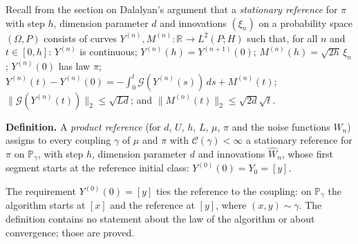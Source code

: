 \documentclass[11pt,a4paper]{article}
\begin{document}
Recall from the section on Dalalyan's argument that a \emph{stationary reference} for \(\pi\) with step \(h\), dimension parameter \(d\) and innovations \((\xi_n)\) on a probability space \((\Omega,P)\) consists of curves \(Y^{(n)},M^{(n)}:\mathbb R\to L^2(P;H)\) such that, for all \(n\) and \(t\in[0,h]\): \(Y^{(n)}\) is continuous; \(Y^{(n)}(h)=Y^{(n+1)}(0)\); \(M^{(n)}(h)=\sqrt{2h}\,\xi_n\); \(Y^{(n)}(0)\) has law \(\pi\); \(Y^{(n)}(t)-Y^{(n)}(0)=-\int_0^t\mathcal G(Y^{(n)}(s))\,ds+M^{(n)}(t)\); \(\|\mathcal G(Y^{(n)}(t))\|_2\le\sqrt{Ld}\); and \(\|M^{(n)}(t)\|_2\le\sqrt{2d}\sqrt t\).




\textbf{Definition.} A \emph{product reference} (for \(d\), \(U\), \(h\), \(L\), \(\mu\), \(\pi\) and the noise functions \(W_n\)) assigns to every coupling \(\gamma\) of \(\mu\) and \(\pi\) with \(\mathcal C(\gamma)<\infty\) a stationary reference for \(\pi\) on \(\mathbb P_\gamma\), with step \(h\), dimension parameter \(d\) and innovations \(\widehat W_n\), whose first segment starts at the reference initial class: \(Y^{(0)}(0)=Y_0=[y]\).




The requirement \(Y^{(0)}(0)=[y]\) ties the reference to the coupling: on \(\mathbb P_\gamma\) the algorithm starts at \([x]\) and the reference at \([y]\), where \((x,y)\sim\gamma\). The definition contains no statement about the law of the algorithm or about convergence; those are proved.
\end{document}
